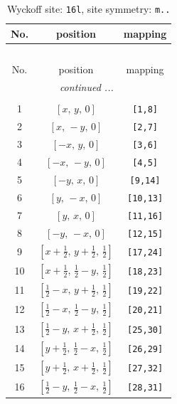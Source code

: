 \documentclass[fleqn,8pt]{jsarticle}
\begin{document}
\renewcommand{\arraystretch}{1.2}
\begin{longtable}{ccc}
\caption{Wyckoff site: {\tt 16l}, site symmetry: {\tt m..}}
 \\
 \hline \hline
No. & position & mapping \\ \hline \endfirsthead

\multicolumn{2}{l}{\tablename\ \thetable{}} \\
 \hline \hline
No. & position & mapping \\ \hline \endhead

 \hline \hline
\multicolumn{2}{r}{\footnotesize\it continued ...} \\ \endfoot

 \hline \hline
\multicolumn{2}{r}{} \\ \endlastfoot

1 & $\left[ x,\, y,\, 0 \right]$ & {\tt [1,8]} \\ \hline
2 & $\left[ x,\, - y,\, 0 \right]$ & {\tt [2,7]} \\ \hline
3 & $\left[ - x,\, y,\, 0 \right]$ & {\tt [3,6]} \\ \hline
4 & $\left[ - x,\, - y,\, 0 \right]$ & {\tt [4,5]} \\ \hline
5 & $\left[ - y,\, x,\, 0 \right]$ & {\tt [9,14]} \\ \hline
6 & $\left[ y,\, - x,\, 0 \right]$ & {\tt [10,13]} \\ \hline
7 & $\left[ y,\, x,\, 0 \right]$ & {\tt [11,16]} \\ \hline
8 & $\left[ - y,\, - x,\, 0 \right]$ & {\tt [12,15]} \\ \hline
9 & $\left[ x + \frac{1}{2},\, y + \frac{1}{2},\, \frac{1}{2} \right]$ & {\tt [17,24]} \\ \hline
10 & $\left[ x + \frac{1}{2},\, \frac{1}{2} - y,\, \frac{1}{2} \right]$ & {\tt [18,23]} \\ \hline
11 & $\left[ \frac{1}{2} - x,\, y + \frac{1}{2},\, \frac{1}{2} \right]$ & {\tt [19,22]} \\ \hline
12 & $\left[ \frac{1}{2} - x,\, \frac{1}{2} - y,\, \frac{1}{2} \right]$ & {\tt [20,21]} \\ \hline
13 & $\left[ \frac{1}{2} - y,\, x + \frac{1}{2},\, \frac{1}{2} \right]$ & {\tt [25,30]} \\ \hline
14 & $\left[ y + \frac{1}{2},\, \frac{1}{2} - x,\, \frac{1}{2} \right]$ & {\tt [26,29]} \\ \hline
15 & $\left[ y + \frac{1}{2},\, x + \frac{1}{2},\, \frac{1}{2} \right]$ & {\tt [27,32]} \\ \hline
16 & $\left[ \frac{1}{2} - y,\, \frac{1}{2} - x,\, \frac{1}{2} \right]$ & {\tt [28,31]} \\
\end{longtable}
\end{document}
